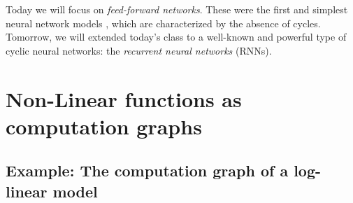 Today we will focus on \textit{feed-forward networks}. These were the first and simplest neural network models , which are characterized by the absence of cycles. Tomorrow, we will extended 
today's class to a well-known and powerful type of cyclic neural networks: the \textit{recurrent neural networks} (RNNs). 

\section{Non-Linear functions as computation graphs} 

\subsection{Example: The computation graph of a log-linear model}


